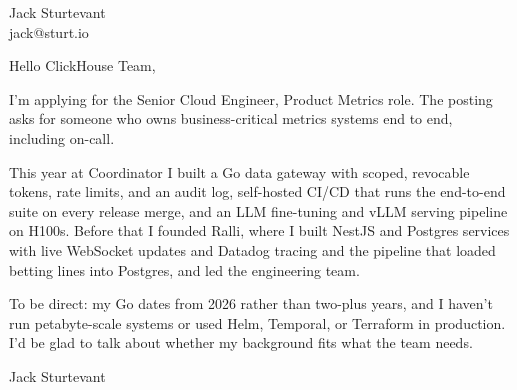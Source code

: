 \documentclass[11pt]{article}
\begin{document}
\raggedright

{\namefont\fontsize{20pt}{24pt}\selectfont Jack Sturtevant}\\[-0.3em]
jack@sturt.io

\vspace{1.2em}

Hello ClickHouse Team,

I'm applying for the Senior Cloud Engineer, Product Metrics role. The posting asks for someone who owns business-critical metrics systems end to end, including on-call.

This year at Coordinator I built a Go data gateway with scoped, revocable tokens, rate limits, and an audit log, self-hosted CI/CD that runs the end-to-end suite on every release merge, and an LLM fine-tuning and vLLM serving pipeline on H100s. Before that I founded Ralli, where I built NestJS and Postgres services with live WebSocket updates and Datadog tracing and the pipeline that loaded betting lines into Postgres, and led the engineering team.

To be direct: my Go dates from 2026 rather than two-plus years, and I haven't run petabyte-scale systems or used Helm, Temporal, or Terraform in production. I'd be glad to talk about whether my background fits what the team needs.

\vspace{0.6em}
Jack Sturtevant
\end{document}
